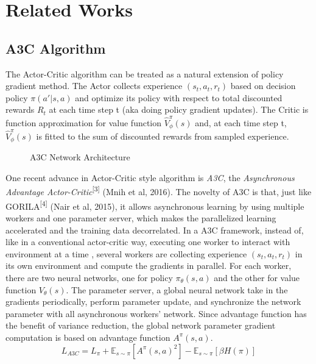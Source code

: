 \documentclass[12pt,twocolumn,letterpaper]{article}
\begin{document}
\section{Related Works}
\subsection{A3C Algorithm}
The Actor-Critic algorithm can be treated as a natural extension of policy gradient method. The Actor collects experience ${(s_t, a_t, r_t)}$ based on decision policy $\pi(a'|s, a)$ and optimize its policy with respect to total discounted rewards $R_t$ at each time step t (aka doing policy gradient updates). The Critic is function approximation for value function $\hat{V}_\phi^\pi(s)$ and, at each time step t, $\hat{V}_\phi^\pi(s)$ is fitted to the sum of discounted rewards from sampled experience. 

\begin{figure}[t]
\begin{center}
\end{center}
   \caption{A3C Network Architecture}
\label{fig:long}
\label{fig:onecol}
\end{figure}

One recent advance in Actor-Critic style algorithm is \textit{A3C}, the \textit{Asynchronous Advantage Actor-Critic}\textsuperscript{[3]} (Mnih et al, 2016). The novelty of A3C is that, just like GORILA\textsuperscript{[4]} (Nair et al, 2015), it allows asynchronous learning by using multiple workers and one parameter server, which makes the parallelized learning accelerated and the training data decorrelated. In a A3C framework, instead of, like in a conventional actor-critic way, executing one worker to interact with environment at a time , several workers are collecting experience ${(s_t, a_t, r_t)}$ in its own environment and compute the gradients in parallel. For each worker, there are two neural networks, one for policy $\pi_\theta(s, a)$ and the other for value function $V_\theta(s)$. The parameter server, a global neural network take in the gradients periodically, perform parameter update, and synchronize the network parameter with all asynchronous workers' network. Since advantage function has the benefit of variance reduction, the global network parameter gradient computation is based on advantage function $A^\pi(s, a)$. 
$$L_{A3C} = L_\pi + \mathbb{E}_{s\sim\pi}[A^\pi(s, a)^2] - \mathbb{E}_{s\sim\pi}[\beta H(\pi)] $$
\end{document}
